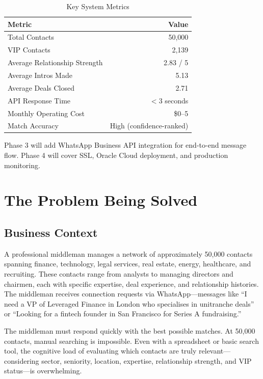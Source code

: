 \documentclass[12pt, a4paper]{report}
\begin{document}
\begin{table}[H]
\centering
\begin{tabular}{lr}
\toprule
\textbf{Metric} & \textbf{Value} \\
\midrule
Total Contacts & 50,000 \\
VIP Contacts & 2,139 \\
Average Relationship Strength & 2.83 / 5 \\
Average Intros Made & 5.13 \\
Average Deals Closed & 2.71 \\
API Response Time & $<$3 seconds \\
Monthly Operating Cost & \$0--5 \\
Match Accuracy & High (confidence-ranked) \\
\bottomrule
\end{tabular}
\caption{Key System Metrics}
\end{table}

Phase 3 will add WhatsApp Business API integration for end-to-end message flow. Phase 4 will cover SSL, Oracle Cloud deployment, and production monitoring.

\chapter{The Problem Being Solved}

\section{Business Context}

A professional middleman manages a network of approximately 50,000 contacts spanning finance, technology, legal services, real estate, energy, healthcare, and recruiting. These contacts range from analysts to managing directors and chairmen, each with specific expertise, deal experience, and relationship histories. The middleman receives connection requests via WhatsApp---messages like ``I need a VP of Leveraged Finance in London who specialises in unitranche deals'' or ``Looking for a fintech founder in San Francisco for Series A fundraising.''

The middleman must respond quickly with the best possible matches. At 50,000 contacts, manual searching is impossible. Even with a spreadsheet or basic search tool, the cognitive load of evaluating which contacts are truly relevant---considering sector, seniority, location, expertise, relationship strength, and VIP status---is overwhelming.
\end{document}
